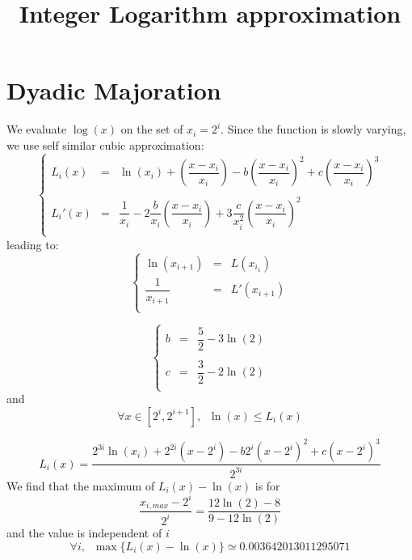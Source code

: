 \documentclass[aps]{revtex4}
\begin{document}
\title{Integer Logarithm approximation}
\maketitle

\section{Dyadic Majoration}
We evaluate $\log(x)$ on the set of $x_i=2^i$.
Since the function is slowly varying, we use self similar cubic approximation:
\begin{equation}
\left\lbrace
\begin{array}{rcl}
	L_i(x)  & = & \ln(x_i) + \left(\dfrac{x-x_i}{x_i}\right) - b \left(\dfrac{x-x_i}{x_i}\right)^2 + c\left(\dfrac{x-x_i}{x_i}\right)^3\\
	\\
	L_i'(x) & = & \dfrac{1}{x_i} - 2\dfrac{b}{x_i} \left(\dfrac{x-x_i}{x_i}\right) + 3 \dfrac{c}{x_i^2}  \left(\dfrac{x-x_i}{x_i}\right)^2 \\
\end{array}
\right.
\end{equation}
leading to:
\begin{equation}
\left\lbrace
\begin{array}{rcl}
	\ln(x_{i+1})       & = & L(x_{i_1})\\
	\dfrac{1}{x_{i+1}} & = & L'(x_{i+1}) \\
\end{array}
\right.
\end{equation}

\begin{equation}
\left\lbrace
\begin{array}{rcl}
b & = & \dfrac{5}{2}-3\ln(2)\\
\\
c & = & \dfrac{3}{2}-2\ln(2)\\
\end{array}
\right.
\end{equation}
and
\begin{equation}
\boxed{
\forall x\in[2^i,2^{i+1}], \;\; \ln(x) \leq L_i(x) 
}
\end{equation}


\begin{equation}
	L_i(x) = \dfrac{
	2^{3i}\ln(x_i) 
	+ 2^{2i}\left(x-2^i\right)
	- b 2^{i}\left(x-2^i\right)^2
	+ c      \left(x-2^i\right)^3
	}
	{2^{3i}} 
\end{equation}
We find that the maximum of $L_i(x)-\ln(x)$ is for 
\begin{equation}
	\dfrac{x_{i,max}-2^i}{2^i} = \dfrac{12\ln(2)-8}{9-12\ln(2)}
\end{equation}
and the value is independent of $i$
\begin{equation}
	\forall i, \;\; \max\lbrace L_i(x)-\ln(x)\rbrace \simeq 0.003642013011295071
\end{equation}
\end{document}
